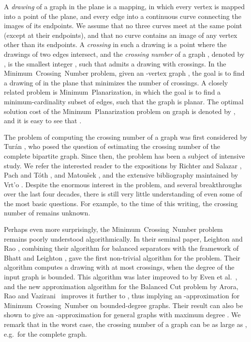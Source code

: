 \documentclass[twoside,leqno,twocolumn]{article}
\newcommand{\MP}{\mbox{\sf Minimum Planarization}\xspace}
\newcommand{\MCN}{\mbox{\sf Minimum Crossing Number}\xspace}
\begin{document}
A \emph{drawing} of a graph  in the plane is a mapping, in which every vertex is mapped into a point of the plane, and every edge into a continuous curve connecting the images of its endpoints.
We assume that no three curves meet at the same point (except at their endpoints), and that no curve contains an image of any vertex other than its endpoints.
A \emph{crossing} in such a drawing is a point where the drawings of two edges intersect, and the \emph{crossing number} of a graph , denoted by , is the smallest integer , such that  admits a drawing with  crossings.
In the \MCN problem, given an -vertex graph ,  the goal is to find a drawing of  in the plane that minimizes the number of crossings.
A closely related problem is \MP, in which the goal is to find a minimum-cardinality subset  of edges, such that the graph  is planar. The optimal solution cost of the \MP problem on graph  is denoted by , and it is easy to see that .


The problem of computing the crossing number of a graph was first considered by Tur\'{a}n \cite{turan_first}, who posed the question of estimating the crossing number of the complete bipartite graph.
Since then, the problem has been a subject of intensive study.
We refer the interested reader to the expositions by Richter and Salazar \cite{richter_survey}, Pach and T\'{o}th \cite{pach_survey}, and Matou\v{s}ek \cite{matousek_book}, and the extensive bibliography maintained by Vrt'o \cite{vrto_biblio}. Despite the enormous interest in the problem, and several breakthroughs over the last four decades, there is still very little understanding of even some of the most basic questions. For example, to the time of this writing, the crossing number of  remains unknown.


Perhaps even more surprisingly, the \MCN problem remains poorly understood algorithmically.
In their seminal paper, Leighton and Rao \cite{LR}, combining their algorithm for balanced separators with the framework of Bhatt and Leighton \cite{bhatt84}, gave the first non-trivial algorithm for the problem. Their algorithm computes a drawing with at most  crossings, when the degree of the input graph is bounded.
This algorithm was later improved to  by Even et al.~\cite{EvenGS02}, and the new approximation algorithm for the Balanced Cut problem by Arora, Rao and Vazirani~\cite{ARV} improves it further to , thus implying an -approximation for \MCN on bounded-degree graphs. Their result can also be shown to give an -approximation for general graphs with maximum degree . We remark that in the worst case, the crossing number of a graph can be as large as , e.g.~for the complete graph.
\end{document}
